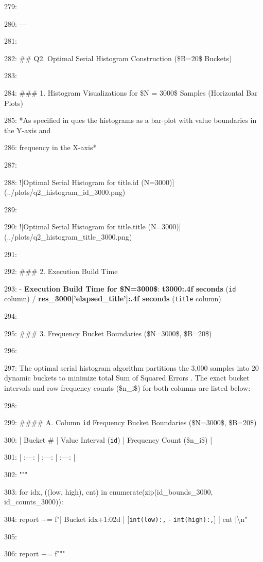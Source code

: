 \documentclass[11pt,a4paper]{article}
\begin{document}
279:

280: ---

281:

282: \#\# Q2. Optimal Serial Histogram Construction (\$B=20\$ Buckets)

283:

284: \#\#\# 1. Histogram Visualizations for \$N = 3000\$ Samples (Horizontal Bar Plots)

285: *As specified in ques the histograms as a bar-plot with value boundaries in the Y-axis and

286: frequency in the X-axis*

287:

288: ![Optimal Serial Histogram for title.id (N=3000)](../plots/q2\_histogram\_id\_3000.png)

289:

290: ![Optimal Serial Histogram for title.title (N=3000)](../plots/q2\_histogram\_title\_3000.png)

291:

292: \#\#\# 2. Execution Build Time

293: - \textbf{Execution Build Time for \$N=3000\$}: \textbf{{t3000:.4f} seconds} (\texttt{id} column) / \textbf{{res\_3000['elapsed\_title']:.4f} seconds} (\texttt{title} column)

294:

295: \#\#\# 3. Frequency Bucket Boundaries (\$N=3000\$, \$B=20\$)

296:

297: The optimal serial histogram algorithm partitions the 3,000 samples into 20 dynamic buckets to minimize total Sum of Squared Errors . The exact bucket intervals and row frequency counts (\$n\_i\$) for both columns are listed below:

298:

299: \#\#\#\# A. Column \texttt{id} Frequency Bucket Boundaries (\$N=3000\$, \$B=20\$)

300: | Bucket \# | Value Interval (\texttt{id}) | Frequency Count (\$n\_i\$) |

301: | :---: | :---: | :---: |

302: """

303:     for idx, ((low, high), cnt) in enumerate(zip(id\_bounds\_3000, id\_counts\_3000)):

304:         report += f"| Bucket {idx+1:02d} | [\texttt{{int(low):,}} - \texttt{{int(high):,}}] | {cnt} |\textbackslash{}n"

305:

306:     report += f"""
\end{document}
